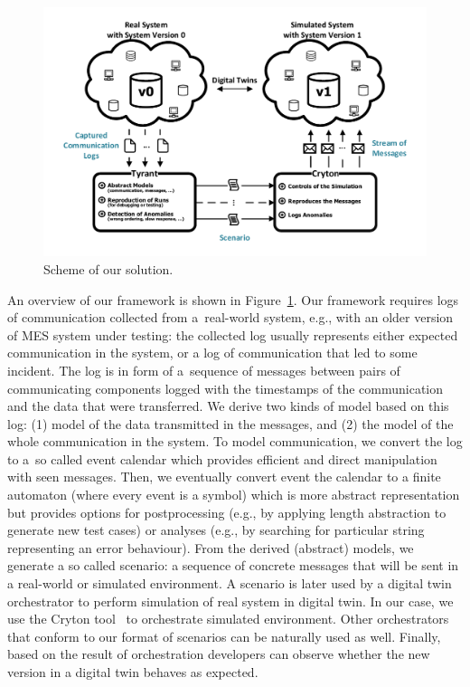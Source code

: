 {%
\begin{figure}[bt]
  \centering
  \includegraphics[scale=0.5]{figs/eurocast-diagram.pdf}
  \caption{Scheme of our solution.}
  \label{fig:tunis-diagram}
\end{figure}

An overview of our framework is shown in Figure~\ref{fig:tunis-diagram}.  
%
Our framework requires logs of communication collected from a~real-world
system, e.g., with an older version of MES system under testing: the collected log
usually represents either expected communication in the system, or a log of
communication that led to some incident.  
%
The log is in form of a~sequence of messages between pairs of communicating
components logged with the timestamps of the communication and the data that
were transferred.
%
We derive two kinds of model based on this log: (1) model of the data
transmitted in the messages, and (2) the model of the whole communication in
the system.
%
To model communication, we convert the log to a~so called event calendar
which provides efficient and direct manipulation with seen messages.
Then, we eventually convert event the calendar to a finite automaton (where
every event is a symbol) which is more abstract representation but provides
options for postprocessing (e.g., by applying length abstraction to generate
new test cases) or analyses (e.g., by searching for particular string
representing an error behaviour).
%
From the derived (abstract) models, we generate a so called scenario: a
sequence of concrete messages that will be sent in a real-world or simulated
environment. 
%
A scenario is later used by a digital twin orchestrator to perform simulation
of real system in digital twin.
%
In our case, we use the Cryton tool~\cite{ref_cryton} to orchestrate simulated
environment. Other orchestrators that conform to our format of scenarios can be
naturally used as well. 
%
%
Finally, based on the result of orchestration developers can observe whether
the new version in a digital twin behaves as expected.

}
